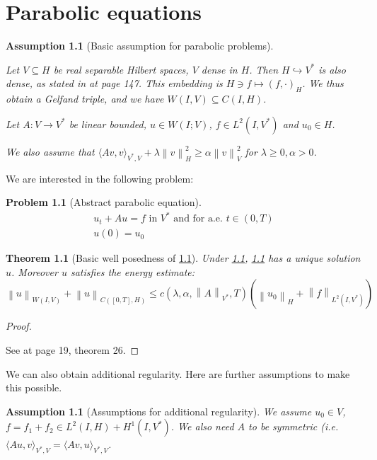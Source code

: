 \documentclass[english,a4paper,12pt,oneside]{scrbook}
\theoremstyle{break}
\newtheorem{thm}[equation]{Theorem}
\newtheorem{ass}[equation]{Assumption}
\newtheorem{pb}[equation]{Problem}
\newenvironment{mproof}[1][\proofname]{%
  \begin{proof}[#1]$ $\par\nobreak\ignorespaces
}{%
  \end{proof}
}
\renewcommand*{\proofname}{Proof}
\theoremstyle{remark}
\newcommand{\norm}[1]{\left\lVert#1\right\rVert}
\newcommand{\HN}[1]{\norm{#1}_{H}}
\newcommand{\VN}[1]{\norm{#1}_{V}}
\newcommand{\VSN}[1]{\norm{#1}_{V^*}}
\begin{document}
\chapter{Parabolic equations}

\begin{ass}[Basic assumption for parabolic problems]
\label{ass:basic_par}

Let $V\subseteq H$ be real separable Hilbert spaces, $V$ dense in $H$. Then $H\hookrightarrow V^*$ is also dense, as stated in \cite{trol} at page 147. This embedding is $H \ni f \mapsto (f, \cdot )_H$. We thus obtain a Gelfand triple, and we have $W(I,V)\subseteq C(I,H)$.

Let $A:V\rightarrow V^* $ be linear bounded, $u \in W(I;V)$, $f \in L^2(I,V^*)$ and $u_0 \in H$.

We also assume that $\langle Av, v \rangle_{V^*,V}+ \lambda \HN{v}^2\geq \alpha \VN{v}^2$ for $\lambda \geq 0, \alpha >0$.
\end{ass}

We are interested in the following problem:

\begin{pb}[Abstract parabolic equation]
\label{eqn:general_parabolic}
\begin{align}
	u_t+Au=f \text{ in }V^* \text{ and for a.e. } t \in (0,T)\\
	u(0)=u_0
\end{align}
\end{pb}

\begin{thm}[Basic well posedness of \cref{eqn:general_parabolic}]
\label{thm:well_pos_parabolic}
Under \cref{ass:basic_par}, \cref{eqn:general_parabolic} has a unique solution $u$. Moreover $u$ satisfies the energy estimate:
\begin{equation}
	\label{eqn:en_est}
	\norm{u}_{W(I,V)} + \norm{u}_{C([0,T],H)}\leq c(\lambda, \alpha, \VSN{A}, T)(\HN{u_0}+\norm{f}_{L^2(I,V^*)})
\end{equation} 
\end{thm}
\begin{mproof}
See \cite{gilardi} at page 19, theorem 26.
\end{mproof}

We can also obtain additional regularity. Here are further assumptions to make this possible.

\begin{ass}[Assumptions for additional regularity]
\label{ass:reg_par}
We assume $u_0 \in V$, $f = f_1+f_2 \in L^2(I,H)+H^1(I,V^*)$. We also need $A$ to be symmetric (i.e. $\langle Au,v \rangle_{V^*,V} = \langle Av,u \rangle_{V^*,V}$.
\end{ass}
\end{document}
